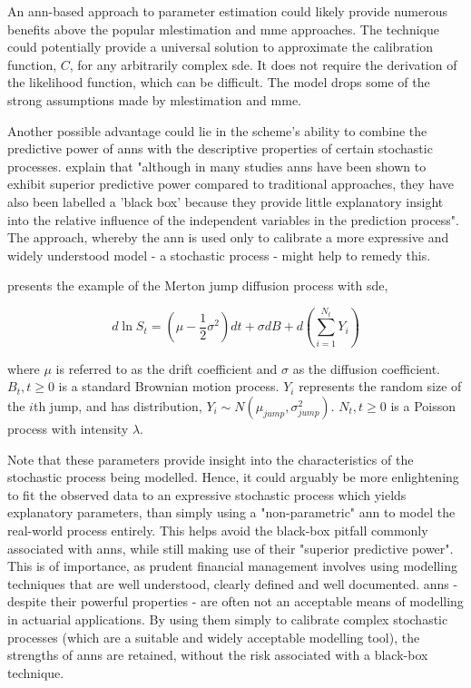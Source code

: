 \documentclass[11pt,oneside,openany,a4paper,english, report, goldenblock
]{usthesis}
\begin{document}
An \acrshort{ann}-based approach to parameter estimation could likely provide numerous benefits above the popular \acrshort{mlestimation} and \acrshort{mme} approaches.
The technique could potentially provide a universal solution to approximate the calibration function, $C$, for any arbitrarily complex \acrshort{sde}.
It does not require the derivation of the likelihood function, which can be difficult.
The model drops some of the strong assumptions made by \acrshort{mlestimation} and \acrshort{mme}. 


Another possible advantage could lie in the scheme's ability to combine the predictive power of \acrshort{ann}s with the descriptive properties of certain stochastic processes. \citet{Olden} explain that "although in many studies \acrshort{ann}s have been shown to exhibit superior predictive power compared to traditional approaches, they have also been labelled a 'black box' because they provide little explanatory insight into the relative influence of the independent variables in the prediction process". The approach, whereby the \acrshort{ann} is used only to calibrate a more expressive and widely understood model - a stochastic process - might help to remedy this.


\citet{Mongwe} presents the example of the Merton jump diffusion process with \acrshort{sde},

\begin{equation}
	d \ln{S_t}= \left( \mu - \frac{1}{2} \sigma^2 \right )dt+\sigma dB +d \left( \sum_{i=1}^{N_t} Y_i \right )
\end{equation}

where $ \mu $  is referred to as the drift coefficient and $ \sigma $ as the diffusion coefficient. $ B_{t}, t\geq 0$ is a standard Brownian motion process. $Y_i$ represents the random size of the $i$th jump, and has distribution, $Y_i \sim N \left( \mu_{jump}, \sigma_{jump}^2 \right )$. $N_t, t \geq 0$ is a Poisson process with intensity $\lambda$.


Note that these parameters provide insight into the characteristics of the stochastic process being modelled. Hence, it could arguably be more enlightening to fit the observed data to an expressive stochastic process which yields explanatory parameters, than simply using a "non-parametric" \acrshort{ann} to model the real-world process entirely. This helps avoid the black-box pitfall commonly associated with \acrshort{ann}s, while still making use of their "superior predictive power". This is of importance, as prudent financial management involves using modelling techniques that are well understood, clearly defined and well documented. \acrshort{ann}s - despite their powerful properties - are often not an acceptable means of modelling in actuarial applications. By using them simply to calibrate complex stochastic processes (which are a suitable and widely acceptable modelling tool), the strengths of \acrshort{ann}s are retained, without the risk associated with a black-box technique.
\end{document}
